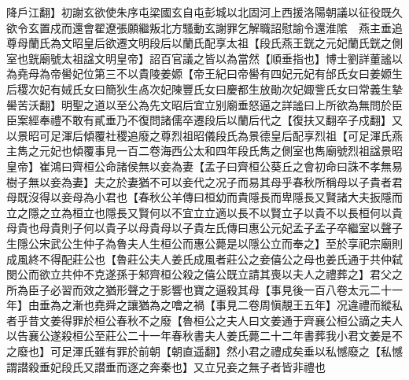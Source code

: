 降戶江翻】初謝玄欲使朱序屯梁國玄自屯彭城以北固河上西援洛陽朝議以征役既久欲令玄置戍而還會翟遼張願繼叛北方騷動玄謝罪乞解職詔慰諭令還淮隂　燕主垂追尊母蘭氏為文昭皇后欲遷文明段后以蘭氏配享太祖【段氏燕王皝之元妃蘭氏皝之側室也皝廟號太祖諡文明皇帝】詔百官議之皆以為當然【順垂指也】博士劉詳董謐以為堯母為帝嚳妃位第三不以貴陵姜嫄【帝王紀曰帝嚳有四妃元妃有邰氏女曰姜嫄生后稷次妃有娀氏女曰簡狄生卨次妃陳豐氏女曰慶都生放勛次妃娵訾氏女曰常義生摯嚳苦沃翻】明聖之道以至公為先文昭后宜立别廟垂怒逼之詳謐曰上所欲為無問於臣臣案經奉禮不敢有貳垂乃不復問諸儒卒遷段后以蘭后代之【復扶又翻卒子戍翻】又以景昭可足渾后傾覆社稷追廢之尊烈祖昭儀段氏為景德皇后配享烈祖【可足渾氏燕主雋之元妃也傾覆事見一百二卷海西公太和四年段氏雋之側室也雋廟號烈祖諡景昭皇帝】崔鴻曰齊桓公命諸侯無以妾為妻【孟子曰齊桓公葵丘之會初命曰誅不孝無易樹子無以妾為妻】夫之於妻猶不可以妾代之况子而易其母乎春秋所稱母以子貴者君母既沒得以妾母為小君也【春秋公羊傳曰桓幼而貴隱長而卑隱長又賢諸大夫扳隱而立之隱之立為桓立也隱長又賢何以不宜立立適以長不以賢立子以貴不以長桓何以貴母貴也母貴則子何以貴子以母貴母以子貴左氏傳曰惠公元妃孟子孟子卒繼室以聲子生隱公宋武公生仲子為魯夫人生桓公而惠公薨是以隱公立而奉之】至於享祀宗廟則成風終不得配莊公也【魯莊公夫人姜氏成風者莊公之妾僖公之母也姜氏通于共仲弑閔公而欲立共仲不克遂孫于邾齊桓公殺之僖公既立請其喪以夫人之禮葬之】君父之所為臣子必習而效之猶形聲之于影響也寶之逼殺其母【事見後一百八卷太元二十一年】由垂為之漸也堯舜之讓猶為之噲之禍【事見二卷周愼靚王五年】况違禮而縱私者乎昔文姜得罪於桓公春秋不之廢【魯桓公之夫人曰文姜通于齊襄公桓公謫之夫人以告襄公遂殺桓公至莊公二十一年春秋書夫人姜氏薨二十二年書葬我小君文姜是不之廢也】可足渾氏雖有罪於前朝【朝直遥翻】然小君之禮成矣垂以私憾廢之【私憾謂譛殺垂妃段氏又譛垂而逐之奔秦也】又立兄妾之無子者皆非禮也


